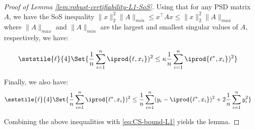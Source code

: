 \begin{proof}[Proof of Lemma \ref{lem:robust-certifiability-L1-SoS}]
Using that for any PSD matrix $A$, we have the SoS inequality $\|x\|_2^2 \|A\|_{min} \leq x^{\top} A x \leq \|x\|_2^2 \|A\|_{max}$ where $\|A\|_{max}$ and $\|A\|_{min}$ are the largest and smallest singular values of $A$, respectively, we have:

\[
\sststile{\ell}{4} \Set{ \frac{1}{n} \sum_{i =1}^n \iprod{\ell,x_i})^2 \leq \kappa \frac{1}{n} \sum_{i =1}^n \iprod{\ell^{*},x_i})^2  }
\]

Finally, we also have:
\[
\sststile{\ell}{4} \Set{\frac{1}{n} \sum_{i =1}^n \iprod{\ell^{*},x_i})^2 \leq \frac{1}{n} \sum_{i =1}^n (y_i - \iprod{\ell^{*},x_i})^2  + 2\frac{1}{n} \sum_{i =1}^n y_i^2 }
\]

Combining the above inequalities with \eqref{eq:CS-bound-L1} yields the lemma.

\end{proof}







